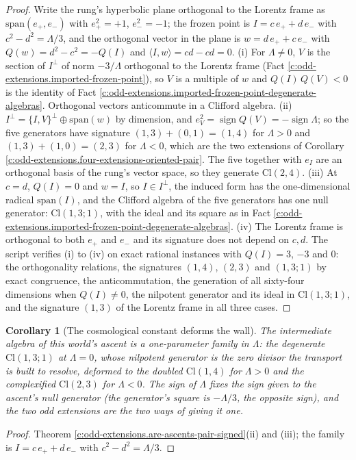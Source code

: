 \documentclass[11pt]{article}
\newtheorem{corollary}[theorem]{Corollary}
\theoremstyle{definition}
\theoremstyle{plain}
\providecommand{\Cl}{}\renewcommand{\Cl}{\mathrm{Cl}}
\providecommand{\ip}{}\renewcommand{\ip}[2]{\langle #1, #2\rangle}
\begin{document}
\begin{proof}
Write the rung's hyperbolic plane orthogonal to the Lorentz frame as $\mathrm{span}(e_{+}, e_{-})$ with $e_{+}^{2} = +1$, $e_{-}^{2} = -1$; the frozen point is $I = c\,e_{+} + d\,e_{-}$ with $c^{2} - d^{2} = \Lambda/3$, and the orthogonal vector in the plane is $w = d\,e_{+} + c\,e_{-}$ with $Q(w) = d^{2} - c^{2} = -Q(I)$ and $\ip{I}{w} = cd - cd = 0$. (i) For $\Lambda \neq 0$, $V$ is the section of $I^{\perp}$ of norm $-3/\Lambda$ orthogonal to the Lorentz frame (Fact \ref{c:odd-extensions.imported-frozen-point}), so $V$ is a multiple of $w$ and $Q(I)\,Q(V) < 0$ is the identity of Fact \ref{c:odd-extensions.imported-frozen-point-degenerate-algebras}. Orthogonal vectors anticommute in a Clifford algebra. (ii) $I^{\perp} = \{I,V\}^{\perp} \oplus \mathrm{span}(w)$ by dimension, and $e_{V}^{2} = \operatorname{sign}Q(V) = -\operatorname{sign}\Lambda$; so the five generators have signature $(1,3) + (0,1) = (1,4)$ for $\Lambda > 0$ and $(1,3) + (1,0) = (2,3)$ for $\Lambda < 0$, which are the two extensions of Corollary \ref{c:odd-extensions.four-extensions-oriented-pair}. The five together with $e_{I}$ are an orthogonal basis of the rung's vector space, so they generate $\Cl(2,4)$. (iii) At $c = d$, $Q(I) = 0$ and $w = I$, so $I \in I^{\perp}$, the induced form has the one-dimensional radical $\mathrm{span}(I)$, and the Clifford algebra of the five generators has one null generator: $\Cl(1,3;1)$, with the ideal and its square as in Fact \ref{c:odd-extensions.imported-frozen-point-degenerate-algebras}. (iv) The Lorentz frame is orthogonal to both $e_{+}$ and $e_{-}$ and its signature does not depend on $c, d$. The script verifies (i) to (iv) on exact rational instances with $Q(I) = 3$, $-3$ and $0$: the orthogonality relations, the signatures $(1,4)$, $(2,3)$ and $(1,3;1)$ by exact congruence, the anticommutation, the generation of all sixty-four dimensions when $Q(I) \neq 0$, the nilpotent generator and its ideal in $\Cl(1,3;1)$, and the signature $(1,3)$ of the Lorentz frame in all three cases.

\end{proof}

\begin{corollary}[The cosmological constant deforms the wall]\label{c:odd-extensions.cosmological-constant-deforms-wall}
The intermediate algebra of this world's ascent is a one-parameter family in $\Lambda$: the degenerate $\Cl(1,3;1)$ at $\Lambda = 0$, whose nilpotent generator is the zero divisor the transport is built to resolve, deformed to the doubled $\Cl(1,4)$ for $\Lambda > 0$ and the complexified $\Cl(2,3)$ for $\Lambda < 0$. The sign of $\Lambda$ fixes the sign given to the ascent's null generator (the generator's square is $-\Lambda/3$, the opposite sign), and the two odd extensions are the two ways of giving it one.
\end{corollary}
\begin{proof}
Theorem \ref{c:odd-extensions.are-ascents-pair-signed}(ii) and (iii); the family is $I = c\,e_{+} + d\,e_{-}$ with $c^{2} - d^{2} = \Lambda/3$.

\end{proof}
\end{document}
